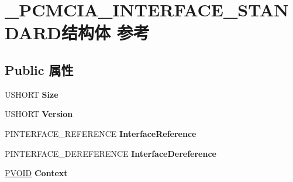 \hypertarget{struct___p_c_m_c_i_a___i_n_t_e_r_f_a_c_e___s_t_a_n_d_a_r_d}{}\section{\+\_\+\+P\+C\+M\+C\+I\+A\+\_\+\+I\+N\+T\+E\+R\+F\+A\+C\+E\+\_\+\+S\+T\+A\+N\+D\+A\+R\+D结构体 参考}
\label{struct___p_c_m_c_i_a___i_n_t_e_r_f_a_c_e___s_t_a_n_d_a_r_d}
\subsection*{Public 属性}
\begin{DoxyCompactItemize}
\item 
\mbox{\label{struct___p_c_m_c_i_a___i_n_t_e_r_f_a_c_e___s_t_a_n_d_a_r_d_a878d36b39501d2699769b83aa6e16a2b}} 
U\+S\+H\+O\+RT {\bfseries Size}
\item 
\mbox{\label{struct___p_c_m_c_i_a___i_n_t_e_r_f_a_c_e___s_t_a_n_d_a_r_d_a7372493acf91f2489d6b4f55563a692c}} 
U\+S\+H\+O\+RT {\bfseries Version}
\item 
\mbox{\label{struct___p_c_m_c_i_a___i_n_t_e_r_f_a_c_e___s_t_a_n_d_a_r_d_a793c3fc49dee0fad1c06889b27ecd65c}} 
P\+I\+N\+T\+E\+R\+F\+A\+C\+E\+\_\+\+R\+E\+F\+E\+R\+E\+N\+CE {\bfseries Interface\+Reference}
\item 
\mbox{\label{struct___p_c_m_c_i_a___i_n_t_e_r_f_a_c_e___s_t_a_n_d_a_r_d_a2f5cc7e1046c0057879b5822e20eeb60}} 
P\+I\+N\+T\+E\+R\+F\+A\+C\+E\+\_\+\+D\+E\+R\+E\+F\+E\+R\+E\+N\+CE {\bfseries Interface\+Dereference}
\item 
\mbox{\label{struct___p_c_m_c_i_a___i_n_t_e_r_f_a_c_e___s_t_a_n_d_a_r_d_aaa34e6bdc9cfa78f99e922a5ebe10557}} 
\hyperlink{interfacevoid}{P\+V\+O\+ID} {\bfseries Context}
\item 
\mbox{\label{struct___p_c_m_c_i_a___i_n_t_e_r_f_a_c_e___s_t_a_n_d_a_r_d_a6e48a37d0c28e53d7205b8cda2c8349f}} 

\end{DoxyCompactItemize}
